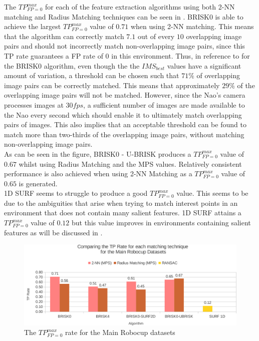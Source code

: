 \documentclass[11pt]{report}
\begin{document}
The $TP_{FP=0}^{max}$ for each of the feature extraction algorithms using both 2-NN matching and Radius Matching techniques can be seen in . BRISK0 is able to achieve the largest $TP_{FP=0}^{max}$ value of $0.71$ when using 2-NN matching. This means that the algorithm can correctly match $7.1$ out of every $10$ overlapping image pairs and should not incorrectly match non-overlapping image pairs, since this TP rate guarantees a FP rate of $0$ in this environment. Thus, in reference to  for the BRISK0 algorithm, even though the the $IMS_{best}$ values have a significant amount of variation, a threshold can be chosen such that $71\%$ of overlapping image pairs can be correctly matched. This means that approximately $29\%$ of the overlapping image pairs will not be matched. However, since the Nao's camera processes images at $30 fps$, a sufficient number of images are made available to the Nao every second which should enable it to ultimately match overlapping pairs of images. This also implies that an acceptable threshold can be found to match more than two-thirds of the overlapping image pairs, without matching non-overlapping image pairs.\\

As can be seen in the figure, BRISK0 - U-BRISK produces a $TP_{FP=0}^{max}$ value of $0.67$ whilst using Radius Matching and the MPS values. Relatively consistent performance is also achieved when using 2-NN Matching as a $TP_{FP=0}^{max}$ value of $0.65$ is generated.\\ 

1D SURF seems to struggle to produce a good $TP_{FP=0}^{max}$ value. This seems to be due to the ambiguities that arise when trying to match interest points in an environment that does not contain many salient features. 1D SURF attains a $TP_{FP=0}^{max}$ value of $0.12$ but this value improves in environments containing salient features as will be discussed in .\\

\begin{figure}
  \centering
    \includegraphics[width=1.0\textwidth]{../Drawings/Graphs/tp_rate_mrb.pdf}
    \caption{The $TP_{FP=0}^{max}$ rate for the Main Robocup datasets} 
    \label{fig:tp_rate_mrd}
\end{figure}
\end{document}
